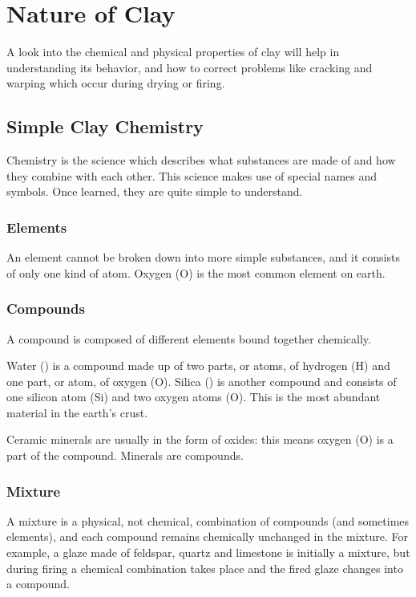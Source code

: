 \chapter{Nature of Clay}
A look into the chemical and physical properties of clay will help in 
understanding its behavior, and how to correct problems like cracking and 
warping which occur during drying or firing.
\section{Simple Clay Chemistry}
Chemistry is the science which describes what substances are made of and how 
they combine with each other. This science makes use of special names and 
symbols. Once learned, they are quite simple to understand.
\subsection{Elements}
An element cannot be broken down into more simple substances, and it consists 
of only one kind of atom. Oxygen (O) is the most common element on earth.
\subsection{Compounds}
A compound is composed of different elements bound together chemically. 

Water () is a compound made up of two parts, or atoms, of hydrogen (H) 
and one part, or atom, of oxygen (O). Silica () is another compound 
and consists of one silicon atom (Si) and two oxygen atoms (O). This is the most
abundant material in the earth's crust.

Ceramic minerals are usually in the form of oxides: this means oxygen (O) is a 
part of the compound. Minerals are compounds.
\subsection{Mixture}
A mixture is a physical, not chemical, combination of compounds (and sometimes 
elements), and each compound remains chemically unchanged in the mixture. For 
example, a glaze made of feldspar, quartz and limestone is initially a mixture, 
but during firing a chemical combination takes place and the fired glaze 
changes into a compound.
